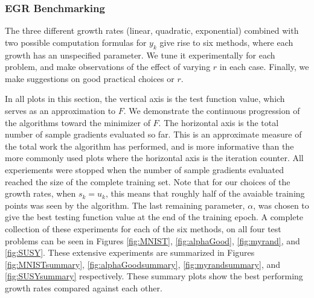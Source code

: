 \documentclass[11pt]{article}
\begin{document}
   
   \subsubsection{EGR Benchmarking}
   
   The three different growth rates (linear, quadratic, exponential) combined with two possible computation formulas for $y_k$ give rise to six methods, where each growth has an unspecified parameter. We tune it experimentally for each problem, and make observations of the effect of varying $r$ in each case. Finally, we make suggestions on good practical choices or $r$. 
   
   In all plots in this section, the vertical axis is the test function value, which serves as an approximation to $F$. We demonstrate the continuous progression of the algorithms toward the minimizer of $F$. The horizontal axis is the total number of sample gradients evaluated so far. This is an approximate measure of the total work the algorithm has performed, and is more informative than the more commonly used plots where the horizontal axis is the iteration counter. All experiements were stopped when the number of sample gradients evaluated reached the size of the complete training set. Note that for our choices of the growth rates, when $s_k=u_k$, this means that roughly half of the avaiable training points was seen by the algorithm. 
  The last remaining parameter, $\alpha$, was chosen to give the best testing function value at the end of the training epoch. A complete collection of these experiments for each of the six methods, on all four test problems can be seen in Figures \ref{fig:MNIST}, \ref{fig:alphaGood}, \ref{fig:myrand}, and \ref{fig:SUSY}. These extensive experiments are summarized in Figures \ref{fig:MNISTsummary}, \ref{fig:alphaGoodsummary}, \ref{fig:myrandsummary}, and \ref{fig:SUSYsummary} respectively. These summary plots show the best performing growth rates compared against each other. 

   
\end{document}
